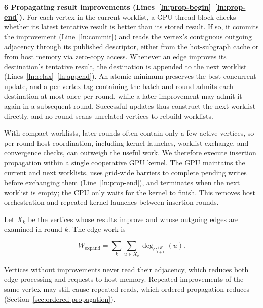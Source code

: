 \textbf{6 Propagating result improvements (Lines~\ref{ln:prop-begin}--\ref{ln:prop-end}).} For each vertex in the current worklist, a GPU thread block checks whether its latest tentative result is better than its stored result. If so, it commits the improvement (Line~\ref{ln:commit}) and reads the vertex's contiguous outgoing adjacency through its published descriptor, either from the hot-subgraph cache or from host memory via zero-copy access. Whenever an edge improves its destination's tentative result, the destination is appended to the next worklist (Lines~\ref{ln:relax}--\ref{ln:append}). An atomic minimum preserves the best concurrent update, and a per-vertex tag containing the batch and round admits each destination at most once per round, while a later improvement may admit it again in a subsequent round. Successful updates thus construct the next worklist directly, and no round scans unrelated vertices to rebuild worklists.

With compact worklists, later rounds often contain only a few active vertices, so per-round host coordination, including kernel launches, worklist exchange, and convergence checks, can outweigh the useful work. We therefore execute insertion propagation within a single cooperative GPU kernel. The GPU maintains the current and next worklists, uses grid-wide barriers to complete pending writes before exchanging them (Line~\ref{ln:prop-end}), and terminates when the next worklist is empty; the CPU only waits for the kernel to finish. This removes host orchestration and repeated kernel launches between insertion rounds.

Let $X_k$ be the vertices whose results improve and whose outgoing edges are examined in round $k$. The edge work is

\begin{equation}
W_{\mathrm{expand}}=
\sum_k\sum_{u\in X_k}\deg^+_{G_{t+1}^{+E}}(u).
\end{equation}

Vertices without improvements never read their adjacency, which reduces both edge processing and requests to host memory. Repeated improvements of the same vertex may still cause repeated reads, which ordered propagation reduces (Section~\ref{sec:ordered-propagation}).


